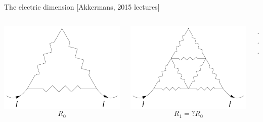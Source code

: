 \documentclass[xcolor=x11names,compress,professionalfonts]{beamer}
\renewcommand{\(}{\begin{columns}}
\renewcommand{\)}{\end{columns}}
\newcommand{\<}[1]{\begin{column}{#1}}
\renewcommand{\>}{\end{column}}
\begin{document}
\begin{frame}{The electric dimension}
{\scriptsize [Akkermans, 2015 lectures]}
\begin{columns}
\newcommand{\s}{.2}
  \begin{column}{3cm}
  	\centering
    \includegraphics[scale=\s]{res0.pdf}
    \scriptsize
    \[ R_0 \]
  \end{column}

  \begin{column}{3cm}
  	\centering
     \includegraphics[scale=\s]{res1.pdf}
     \scriptsize
    \[ R_1= ? R_0 \]
  \end{column}
  
  \begin{column}{1cm}
  \centering
  ...
  \end{column}
  

\end{columns}
\end{frame}
\end{document}
